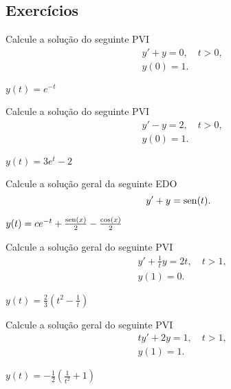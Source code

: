 \subsection*{Exercícios}

\begin{exer}
  Calcule a solução do seguinte PVI
  \begin{align}
    &y' + y = 0, \quad t>0, \\
    &y(0) = 1.    
  \end{align}
\end{exer}
\begin{resp}
  $y(t) = e^{-t}$
\end{resp}

\begin{exer}
  Calcule a solução do seguinte PVI
  \begin{align}
    &y' - y = 2, \quad t>0, \\
    &y(0) = 1.    
  \end{align}
\end{exer}
\begin{resp}
  $y(t) = 3e^{t}-2$
\end{resp}

\begin{exer}
  Calcule a solução geral da seguinte EDO
  \begin{equation}
    y' + y = \operatorname{sen}(t).
  \end{equation}
\end{exer}
\begin{resp}
  $y(t) = ce^{-t} + \frac{\operatorname{sen}(x)}{2} - \frac{\cos(x)}{2}$
\end{resp}

\begin{exer}
  Calcule a solução geral do seguinte PVI
  \begin{align}
    &y' + \frac{1}{t}y = 2t,\quad t>1,\\
    &y(1) = 0.
  \end{align}
\end{exer}
\begin{resp}
  $y(t) = \frac{2}{3}\left(t^2 - \frac{1}{t}\right)$
\end{resp}

\begin{exer}
  Calcule a solução geral do seguinte PVI
  \begin{align}
    &ty' + 2y = 1,\quad t>1,\\
    &y(1) = 1.
  \end{align}
\end{exer}
\begin{resp}
  $y(t) = -\frac{1}{2}\left(\frac{1}{t^2} + 1\right)$
\end{resp}

